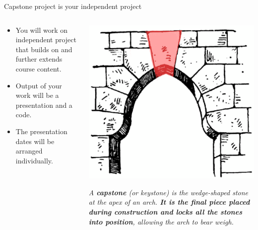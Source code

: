 \begin{frame}{Capstone project is your independent project}
\begin{columns}
    \begin{column}{0.55\textwidth}
        \begin{itemize}
            \item You will work on independent project that builds on and further extends course content.  
            \item Output of your work will be a presentation and a code. 
            \item The presentation dates will be arranged individually. 
        \end{itemize}
    \end{column}
    \begin{column}{0.45\textwidth}
    \footnotesize
    \begin{center}
        \includegraphics[scale = 0.75]{lesson_1/images/capstone.png} 
        \end{center}
    \vspace{1em}
       \textit{ A  \textbf{capstone} (or keystone) is the wedge-shaped stone at the apex of an arch. \textbf{It is the final piece placed during construction and locks all the stones into position}, allowing the arch to bear weigh.}
 
    \end{column}
\end{columns}
\end{frame}

